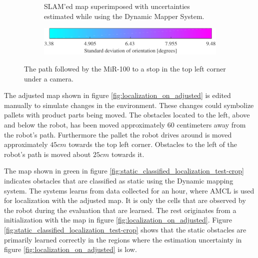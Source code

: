 \begin{figure}[htbp]
\begin{subfigure}[t]{0.45\textwidth}
        \caption{SLAM'ed map superimposed with uncertainties estimated while using the Dynamic Mapper System.}
        \label{fig:simulated_true_map}
    \end{subfigure}
    \begin{subfigure}[t]{1\textwidth}
        \centering
        \includegraphics[scale=1.0]{chapters/evaluation/figures/localization_bar-crop}
    \end{subfigure}
    \caption{The path followed by the MiR-100 to a stop in the top left corner under a camera.}
    \label{fig:test_map_setup}
\end{figure}

The adjusted map shown in figure \ref{fig:localization_on_adjusted} is edited manually to simulate changes in the environment. These changes could symbolize pallets with product parts being moved. 
The obstacles located to the left, above and below the robot, has been moved approximately $60$ centimeters away from the robot's path.
Furthermore the pallet the robot drives around is moved approximately $45cm$ towards the top left corner.
Obstacles to the left of the robot's path is moved about $25cm$ towards it.

The map shown in green in figure \ref{fig:static_classified_localization_test-crop} indicates obstacles that are classified as static using the Dynamic mapping system.
The systems learns from data collected for an hour, where AMCL is used for localization with the adjusted map.
It is only the cells that are observed by the robot during the evaluation that are learned. 
The rest originates from a initialization with the map in figure \ref{fig:localization_on_adjusted}.
Figure \ref{fig:static_classified_localization_test-crop} shows that the static obstacles are primarily learned correctly in the regions where the estimation uncertainty in figure \ref{fig:localization_on_adjusted} is low.

